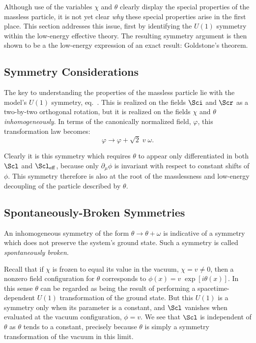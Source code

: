 \documentclass[12pt]{article}
\def\eq{\begin{equation}}
\def\eeq{\end{equation}}
\begin{document}
Although use of the variables $\chi$ and $\theta$ clearly
display the special properties of the massless particle, it is not
yet clear {\em why} these special properties arise in the first
place. This section addresses this issue, first by identifying
the $U(1)$ symmetry within the low-energy effective theory.
The resulting symmetry argument is then shown to be a the
low-energy expression of an exact result: Goldstone's theorem.

\subsection{Symmetry Considerations}

The key to understanding the properties of the massless
particle lie with the model's $U(1)$ symmetry, eq.~.
This is realized on the fields $\Sci$ and $\Scr$ as a two-by-two 
orthogonal rotation, but it is realized on the fields $\chi$ and
$\theta$ {\em inhomogeneously}. In terms of the canonically normalized
field, $\varphi$, this transformation law becomes: 
%
\eq
\label{gbabeltransf}
\varphi \to \varphi + \sqrt{2} \; v \; \omega. \eeq

Clearly it is this symmetry which requires $\theta$ to
appear only differentiated in both $\Scl$ and $\Scl_{\rm eff}$,
because only $\partial_\mu \phi$ is invariant with respect to
constant shifts of $\phi$. This symmetry therefore is also at
the root of the masslessness and low-energy decoupling of
the particle described by $\theta$. 

\subsection{Spontaneously-Broken Symmetries}

An inhomogeneous symmetry of the form $\theta \to \theta
+ \omega$ is indicative of a symmetry which does not 
preserve the system's ground state. Such a symmetry
is called {\sl spontaneously broken}. 

Recall that if $\chi$ is frozen to equal its value in the
vacuum, $\chi = v \ne 0$, then a nonzero field configuration 
for $\theta$ corresponds to $\phi(x) = v \; \exp[ i \theta(x)]$. 
In this sense $\theta$ can be regarded as being the result of
performing a spacetime-dependent $U(1)$ transformation 
of the ground state. But this $U(1)$ is a symmetry only when
its parameter is a constant, and $\Scl$ vanishes when
evaluated at the vacuum configuration, $\phi = v$. We see
that $\Scl$ is independent of $\theta$ as $\theta$ tends to
a constant, precisely because $\theta$ is simply a symmetry
transformation of the vacuum in this limit. 
\end{document}
